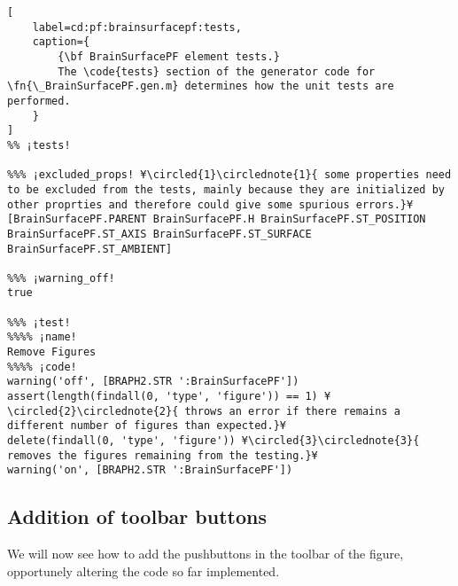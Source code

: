 \documentclass{tufte-handout}
\begin{document}
\begin{lstlisting}[
	label=cd:pf:brainsurfacepf:tests,
	caption={
		{\bf BrainSurfacePF element tests.}
		The \code{tests} section of the generator code for \fn{\_BrainSurfacePF.gen.m} determines how the unit tests are performed.
	}
]
%% ¡tests!

%%% ¡excluded_props! ¥\circled{1}\circlednote{1}{ some properties need to be excluded from the tests, mainly because they are initialized by other proprties and therefore could give some spurious errors.}¥
[BrainSurfacePF.PARENT BrainSurfacePF.H BrainSurfacePF.ST_POSITION BrainSurfacePF.ST_AXIS BrainSurfacePF.ST_SURFACE BrainSurfacePF.ST_AMBIENT]

%%% ¡warning_off!
true

%%% ¡test!
%%%% ¡name!
Remove Figures
%%%% ¡code!
warning('off', [BRAPH2.STR ':BrainSurfacePF'])
assert(length(findall(0, 'type', 'figure')) == 1) ¥\circled{2}\circlednote{2}{ throws an error if there remains a different number of figures than expected.}¥
delete(findall(0, 'type', 'figure')) ¥\circled{3}\circlednote{3}{ removes the figures remaining from the testing.}¥
warning('on', [BRAPH2.STR ':BrainSurfacePF'])
\end{lstlisting}

\subsection{Addition of toolbar buttons}

We will now see how to add the pushbuttons in the toolbar of the figure, opportunely altering the code so far implemented.
\end{document}
